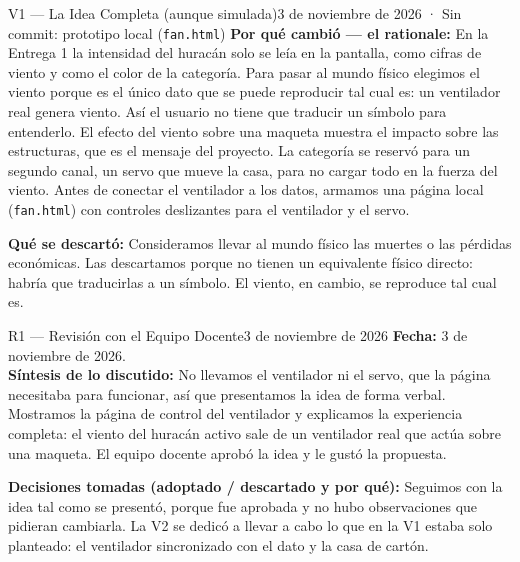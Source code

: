 \documentclass[11pt,a4paper]{article}
\begin{document}
\begin{versionbox}{V1 — La Idea Completa (aunque simulada)}{3 de noviembre de 2026 · Sin commit: prototipo local (\texttt{fan.html})}
		\vspace{0.15cm}
		\noindent\textbf{Por qué cambió — el rationale:}
		En la Entrega 1 la intensidad del huracán solo se leía en la pantalla, como cifras de viento y como el color de la categoría. Para pasar al mundo físico elegimos el viento porque es el único dato que se puede reproducir tal cual es: un ventilador real genera viento. Así el usuario no tiene que traducir un símbolo para entenderlo.
		El efecto del viento sobre una maqueta muestra el impacto sobre las estructuras, que es el mensaje del proyecto. La categoría se reservó para un segundo canal, un servo que mueve la casa, para no cargar todo en la fuerza del viento.
		Antes de conectar el ventilador a los datos, armamos una página local (\texttt{fan.html}) con controles deslizantes para el ventilador y el servo.

		\vspace{0.15cm}
		\noindent\textbf{Qué se descartó:}
		Consideramos llevar al mundo físico las muertes o las pérdidas económicas. Las descartamos porque no tienen un equivalente físico directo: habría que traducirlas a un símbolo. El viento, en cambio, se reproduce tal cual es.
	\end{versionbox}

	\vspace{0.4cm}

	\begin{revisionbox}{R1 — Revisión con el Equipo Docente}{3 de noviembre de 2026}
		\noindent\textbf{Fecha:} 3 de noviembre de 2026.\\
		\textbf{Síntesis de lo discutido:} No llevamos el ventilador ni el servo, que la página necesitaba para funcionar, así que presentamos la idea de forma verbal. Mostramos la página de control del ventilador y explicamos la experiencia completa: el viento del huracán activo sale de un ventilador real que actúa sobre una maqueta. El equipo docente aprobó la idea y le gustó la propuesta.

		\vspace{0.15cm}
		\noindent\textbf{Decisiones tomadas (adoptado / descartado y por qué):}
		Seguimos con la idea tal como se presentó, porque fue aprobada y no hubo observaciones que pidieran cambiarla. La V2 se dedicó a llevar a cabo lo que en la V1 estaba solo planteado: el ventilador sincronizado con el dato y la casa de cartón.
	\end{revisionbox}
\end{document}
